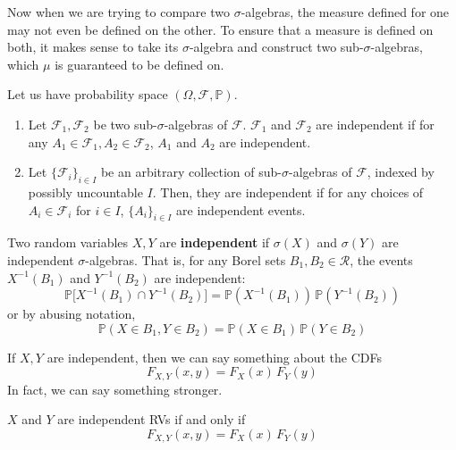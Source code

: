 \documentclass{article}
\begin{document}
    Now when we are trying to compare two $\sigma$-algebras, the measure defined for one may not even be defined on the other. To ensure that a measure is defined on both, it makes sense to take its $\sigma$-algebra and construct two sub-$\sigma$-algebras, which $\mu$ is guaranteed to be defined on. 

    \begin{definition}
      Let us have probability space $(\Omega, \mathcal{F}, \mathbb{P})$. 
      \begin{enumerate}
        \item Let $\mathcal{F}_1, \mathcal{F}_2$ be two sub-$\sigma$-algebras of $\mathcal{F}$. $\mathcal{F}_1$ and $\mathcal{F}_2$ are independent if for any $A_1 \in \mathcal{F}_1, A_2 \in \mathcal{F}_2$, $A_1$ and $A_2$ are independent. 
        \item Let $\{ \mathcal{F}_i\}_{i \in I}$ be an arbitrary collection of sub-$\sigma$-algebras of $\mathcal{F}$, indexed by possibly uncountable $I$. Then, they are independent if for any choices of $A_i \in \mathcal{F}_i$ for $i \in I$, $\{A_i\}_{i \in I}$ are independent events. 
      \end{enumerate}
    \end{definition}

    \begin{definition}
      Two random variables $X, Y$ are \textbf{independent} if $\sigma(X)$ and $\sigma(Y)$ are independent $\sigma$-algebras. That is, for any Borel sets $B_1, B_2 \in \mathcal{R}$, the events $X^{-1}(B_1)$ and $Y^{-1}(B_2)$ are independent: 
      \begin{equation}
        \mathbb{P}\big[ X^{-1}(B_1) \cap Y^{-1}(B_2) \big] = \mathbb{P}(X^{-1}(B_1)) \, \mathbb{P}(Y^{-1}(B_2))
      \end{equation}
      or by abusing notation, 
      \begin{equation}
        \mathbb{P}(X \in B_1, Y \in B_2) = \mathbb{P}(X \in B_1) \, \mathbb{P}(Y \in B_2)
      \end{equation}
    \end{definition}

    If $X, Y$ are independent, then we can say something about the CDFs 
    \begin{equation}
      F_{X, Y} (x, y) = F_X (x) \, F_Y (y)
    \end{equation}
    In fact, we can say something stronger. 

    \begin{theorem}
      $X$ and $Y$ are independent RVs if and only if 
      \begin{equation}
        F_{X, Y} (x, y) = F_X (x) \, F_Y (y)
      \end{equation}
    \end{theorem}
\end{document}

